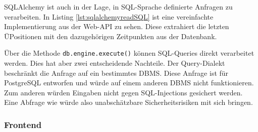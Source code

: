 SQLAlchemy ist auch in der Lage, in SQL-Sprache definierte Anfragen zu verarbeiten. In Listing \ref{lst:sqlalchemyreadSQL} ist eine vereinfachte Implementierung aus der Web-API zu sehen. Diese extrahiert die letzten ÜPositionen mit den dazugehörigen Zeitpunkten aus der Datenbank. 

    
Über die Methode \texttt{db.engine.execute()} können SQL-Queries direkt verarbeitet werden. Dies hat aber zwei entscheidende Nachteile. Der Query-Dialekt beschränkt die Anfrage auf ein bestimmtes DBMS. Diese Anfrage ist für PostgreSQL entworfen und würde auf einem anderen DBMS nicht funktionieren. Zum anderen würden Eingaben nicht gegen SQL-Injections gesichert werden. Eine Abfrage wie 
 würde also unabschätzbare Sicherheitsrisiken mit sich bringen.






\subsubsection{Frontend}




